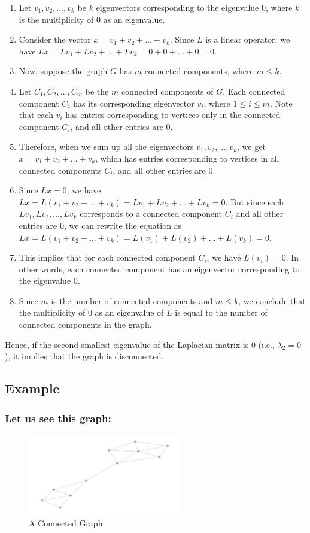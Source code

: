 \documentclass{article}
\begin{document}
\begin{enumerate}
  \item Let $v_1, v_2, \ldots, v_k$ be $k$ eigenvectors corresponding to the eigenvalue $0$, where $k$ is the multiplicity of $0$ as an eigenvalue.
  \item Consider the vector $x = v_1 + v_2 + \ldots + v_k$. Since $L$ is a linear operator, we have $Lx = Lv_1 + Lv_2 + \ldots + Lv_k = 0 + 0 + \ldots + 0 = 0$.
  \item Now, suppose the graph $G$ has $m$ connected components, where $m \leq k$.
  \item Let $C_1, C_2, \ldots, C_m$ be the $m$ connected components of $G$. Each connected component $C_i$ has its corresponding eigenvector $v_i$, where $1 \leq i \leq m$. Note that each $v_i$ has entries corresponding to vertices only in the connected component $C_i$, and all other entries are $0$.
  \item Therefore, when we sum up all the eigenvectors $v_1, v_2, \ldots, v_k$, we get $x = v_1 + v_2 + \ldots + v_k$, which has entries corresponding to vertices in all connected components $C_i$, and all other entries are $0$.
  \item Since $Lx = 0$, we have $Lx = L(v_1 + v_2 + \ldots + v_k) = Lv_1 + Lv_2 + \ldots + Lv_k = 0$. But since each $Lv_1, Lv_2, \ldots, Lv_k$ corresponds to a connected component $C_i$ and all other entries are $0$, we can rewrite the equation as $Lx = L(v_1 + v_2 + \ldots + v_k) = L(v_1) + L(v_2) + \ldots + L(v_k) = 0$.
  \item This implies that for each connected component $C_i$, we have $L(v_i) = 0$. In other words, each connected component has an eigenvector corresponding to the eigenvalue $0$.
  \item Since $m$ is the number of connected components and $m \leq k$, we conclude that the multiplicity of $0$ as an eigenvalue of $L$ is equal to the number of connected components in the graph.
\end{enumerate}

Hence, if the second smallest eigenvalue of the Laplacian matrix is $0$ (i.e., $\lambda_2 = 0$), it implies that the graph is disconnected.
\subsection{Example}
\subsubsection{Let us see this graph:}
\begin{figure}[h]
    \centering
    \includegraphics[width=0.6\textwidth]{congraph.png}
    \caption{A Connected Graph}
    \label{fig:ConnectedGraph}
\end{figure}
\end{document}
